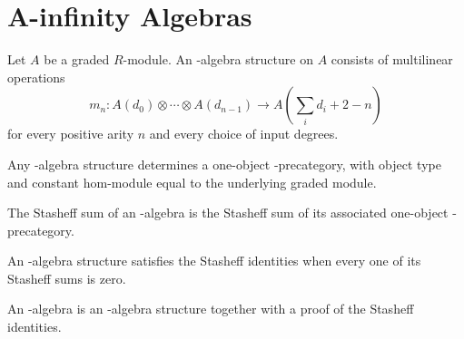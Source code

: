 
\chapter{A-infinity Algebras}

\begin{definition}
\label{AInfinityAlgebraTheory.AInfinityAlgStruct}
{}
Let $A$ be a graded $R$-module. An \Ainf{}-algebra structure on $A$ consists of
multilinear operations
\[
  m_n : A(d_0) \otimes \cdots \otimes A(d_{n-1})
    \to A\!\left(\sum_i d_i + 2 - n\right)
\]
for every positive arity $n$ and every choice of input degrees.
\end{definition}

\begin{definition}
\label{AInfinityAlgebraTheory.AInfinityAlgStruct.toPreCategory}
{}
Any \Ainf{}-algebra structure determines a one-object \Ainf{}-precategory, with
object type  and constant hom-module equal to the underlying graded
module.
\end{definition}

\begin{definition}
\label{AInfinityAlgebraTheory.AInfinityAlgStruct.stasheffSum}
{}
The Stasheff sum of an \Ainf{}-algebra is the Stasheff sum of its associated
one-object \Ainf{}-precategory.
\end{definition}

\begin{definition}[Algebra Stasheff property]
\label{AInfinityAlgebraTheory.AInfinityAlgStruct.satisfiesStasheff}
{}
An \Ainf{}-algebra structure satisfies the Stasheff identities when every one of
its Stasheff sums is zero.
\end{definition}

\begin{definition}
\label{AInfinityAlgebraTheory.AInfinityAlgebra}
{}
An \Ainf{}-algebra is an \Ainf{}-algebra structure together with a proof of the
Stasheff identities.
\end{definition}


